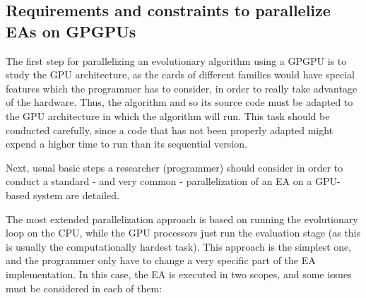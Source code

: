 \documentclass{article}
\begin{document}
\subsection{Requirements and constraints to parallelize EAs on GPGPUs}

The first step for parallelizing an evolutionary algorithm using a GPGPU is to study the GPU architecture, as the cards of different families would have special features which the programmer has to consider, in order to really take advantage of the hardware. 
Thus, the algorithm and so its source code must be adapted to the GPU architecture in which the algorithm will run. 
This task should be conducted carefully, since a code that has not been properly adapted might expend a higher time to run than its sequential version.

Next, usual basic steps a researcher (programmer) should consider in order to conduct a standard - and very common - parallelization of an EA on a GPU-based system are detailed.

The most extended parallelization approach is based on running the evolutionary loop on the CPU, while the GPU processors just run the evaluation stage (as this is usually the computationally hardest task). This approach is the simplest one, and the programmer only have to change a very specific part of the EA implementation. In this case, the EA is executed in two scopes, and some issues must be considered in each of them:
\end{document}
